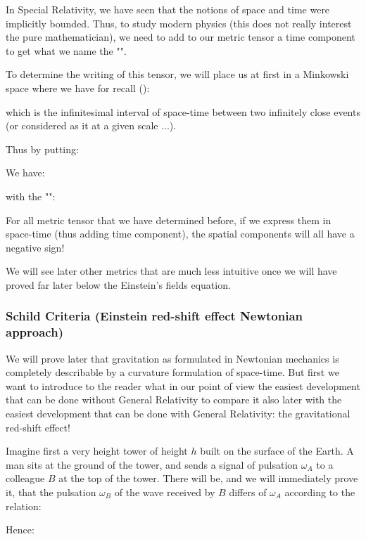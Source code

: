 	In Special Relativity, we have seen that the notions of space and time were implicitly bounded. Thus, to study modern physics (this does not really interest  the pure mathematician), we need to add to our metric tensor a time component  to get what we name the "".
	
	To determine the writing of this tensor, we will place us at first in a Minkowski space where we have for recall ():
	
	which is the infinitesimal interval of space-time between two infinitely close events (or considered as it at a given scale ...).

	Thus by putting:
	
	We have:
	
	with the "":
	
	\begin{tcolorbox}[title=Remark,colframe=black,arc=10pt]
	For all metric tensor that we have determined before, if we express them in space-time (thus adding time component), the spatial components will all have a negative sign!
	\end{tcolorbox}
	We will see later other metrics that are much less intuitive once we will have proved far later below the Einstein's fields equation.
	
	\subsubsection{Schild Criteria (Einstein red-shift effect Newtonian approach)}
	We will prove later that gravitation as formulated in Newtonian mechanics is completely describable by a curvature formulation of space-time. But first we want to introduce to the reader what in our point of view the easiest development that can be done without General Relativity to compare it also later with the easiest development that can be done with General Relativity: the gravitational red-shift effect!
	
	Imagine first a very height tower of height $h$ built on the surface of the Earth. A man sits at the ground of the tower, and sends a signal of pulsation $\omega_A$ to a colleague $B$ at the top of the tower. There will be, and we will immediately prove it, that the pulsation $\omega_B$ of the wave received by $B$ differs of $\omega_A$ according to the relation:
	
	Hence:
	
